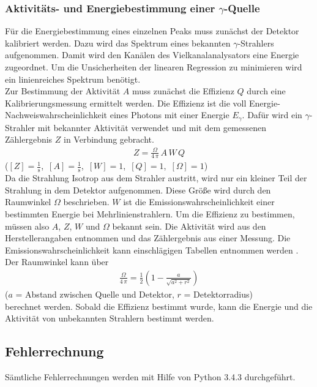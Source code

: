 \subsubsection{Aktivitäts- und Energiebestimmung einer \texorpdfstring{$\gamma$}{}-Quelle}
Für die Energiebestimmung eines einzelnen Peaks muss zunächst der Detektor kalibriert werden. Dazu wird das Spektrum eines bekannten $\gamma$-Strahlers aufgenommen. Damit wird den Kanälen des Vielkanalanalysators eine Energie zugeordnet. Um die Unsicherheiten der linearen Regression zu minimieren wird ein linienreiches Spektrum benötigt. \\
Zur Bestimmung der Aktivität $A$ muss zunächst die Effizienz $Q$ durch eine Kalibrierungsmessung ermittelt werden. Die Effizienz ist die voll Energie-Nachweiswahrscheinlichkeit eines Photons mit einer Energie $E_\gamma$. Dafür wird ein $\gamma$-Strahler mit bekannter Aktivität verwendet und mit dem gemessenen Zählergebnis $Z$ in Verbindung gebracht.
\begin{align}
	Z = \frac{\Omega}{4\,\pi}\,A\,W\,Q
	\label{eqn:Zählergebnis}
\end{align}
\hfil {\footnotesize($[Z] = \frac{1}{\text{s}}$,\ $[A] = \frac{1}{\text{s}}$,\ $[W] = 1$,\ $[Q] = 1$,\ $[\Omega] = 1$)} \hfil \\
Da die Strahlung Isotrop aus dem Strahler austritt, wird nur ein kleiner Teil der Strahlung in dem Detektor aufgenommen. Diese Größe wird durch den Raumwinkel $\Omega$ beschrieben. $W$ ist die Emissionswahrscheinlichkeit einer bestimmten Energie bei Mehrlinienstrahlern. Um die Effizienz zu bestimmen, müssen also $A$, $Z$, $W$ und $\Omega$ bekannt sein. Die Aktivität wird aus den Herstellerangaben entnommen und das Zählergebnis aus einer Messung. Die Emissionswahrscheinlichkeit kann einschlägigen Tabellen entnommen werden \cite{V18}. Der Raumwinkel kann über
\begin{align}
	\frac{\Omega}{4\,\pi} = \frac{1}{2} \left(1 - \frac{a}{\sqrt{a^2 + r^2}} \right)
	\label{eqn:Raumwinkel}
\end{align}
\hfil {\footnotesize($a$ = Abstand zwischen Quelle und Detektor, $r$ = Detektorradius)} \hfil \\
berechnet werden. Sobald die Effizienz bestimmt wurde, kann die Energie und die Aktivität von unbekannten Strahlern bestimmt werden.









\subsection{Fehlerrechnung}
Sämtliche Fehlerrechnungen werden mit Hilfe von Python 3.4.3 durchgeführt.
